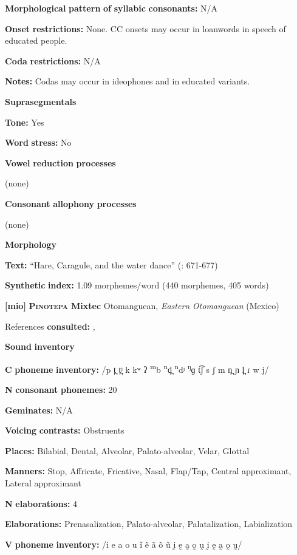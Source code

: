 \begin{styleBody}
\textbf{Morphological} \textbf{pattern} \textbf{of} \textbf{syllabic} \textbf{consonants:} N/A

\textbf{Onset} \textbf{restrictions:} None. CC onsets may occur in loanwords in speech of educated people.

\textbf{Coda} \textbf{restrictions:} N/A

\textbf{Notes:} Codas may occur in ideophones and in educated variants.

\textbf{Suprasegmentals}

\textbf{Tone:} Yes

\textbf{Word} \textbf{stress:} No

\textbf{Vowel} \textbf{reduction} \textbf{processes}

(none)

\textbf{Consonant} \textbf{allophony} \textbf{processes}

(none)

\textbf{Morphology}

\textbf{Text:} “Hare, Caragule, and the water dance” (\citealt{BlackingsFabb2003}: 671-677)

\textbf{Synthetic} \textbf{index:} 1.09 morphemes/word (440 morphemes, 405 words)

\textbf{[mio]}   \textbf{\textsc{Pinotepa} \textbf{Mixtec}}  Otomanguean, \textit{Eastern} \textit{Otomanguean} (Mexico)

References \textbf{consulted:} \citet{Bradley1970}, \citet{Costello2014}

\textbf{Sound} \textbf{inventory}

\textbf{C} \textbf{phoneme} \textbf{inventory:} /p t̪ t̪ʲ k kʷ ʔ \textsuperscript{m}b \textsuperscript{n}d̪ \textsuperscript{n}dʲ \textsuperscript{ŋ}ɡ t͡ʃ s ʃ m n̪ ɲ l̪ ɾ w j/

\textbf{N} \textbf{consonant} \textbf{phonemes:} 20

\textbf{Geminates:} N/A

\textbf{Voicing} \textbf{contrasts:} Obstruents

\textbf{Places:} Bilabial, Dental, Alveolar, Palato-alveolar, Velar, Glottal

\textbf{Manners:} Stop, Affricate, Fricative, Nasal, Flap/Tap, Central approximant, Lateral approximant

\textbf{N} \textbf{elaborations:} 4

\textbf{Elaborations:} Prenasalization, Palato-alveolar, Palatalization, Labialization

\textbf{V} \textbf{phoneme} \textbf{inventory:} /i e a o u ĩ ẽ ã õ ũ ḭ ḛ a̰ o̰ ṵ ḭ ḛ a̰ o̰ ṵ/


\end{styleBody}
